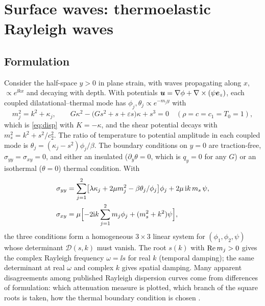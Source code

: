\section{Surface waves: thermoelastic Rayleigh waves}\label{sec:surface}
\subsection{Formulation}
Consider the half-space $y>0$ in plane strain, with waves propagating along $x$, $\propto e^{\ii kx}$ and decaying with depth. With potentials $\bm u=\nabla\phi+\nabla\times(\psi\bm e_z)$, each coupled dilatational--thermal mode has $\phi_j,\theta_j\propto e^{-m_jy}$ with
\begin{equation}
m_j^2=k^2+\kappa_j,\qquad G\kappa^2-\bigl(Gs^2+s+\varepsilon s\bigr)\kappa+s^3=0\quad(\rho=c=c_1=T_0=1),
\end{equation}
which is \eqref{eq:disp} with $K=-\kappa$, and the shear potential decays with $m_s^2=k^2+s^2/c_2^2$. The ratio of temperature to potential amplitude in each coupled mode is $\theta_j=(\kappa_j-s^2)\phi_j/\beta$. The boundary conditions on $y=0$ are traction-free, $\sigma_{yy}=\sigma_{xy}=0$, and either an insulated ($\partial_y\theta=0$, which is $q_y=0$ for any $G$) or an isothermal ($\theta=0$) thermal condition. With
\begin{align}
\sigma_{yy}&=\sum_{j=1}^2\bigl[\lambda\kappa_j+2\mu m_j^2-\beta\theta_j/\phi_j\bigr]\phi_j+2\mu\,\mathrm i k\,m_s\,\psi,\\
\sigma_{xy}&=\mu\Bigl[-2\mathrm i k\sum_{j=1}^2m_j\phi_j+(m_s^2+k^2)\psi\Bigr],
\end{align}
the three conditions form a homogeneous $3\times3$ linear system for $(\phi_1,\phi_2,\psi)$ whose determinant $\mathcal D(s,k)$ must vanish. The root $s(k)$ with $\operatorname{Re} m_j>0$ gives the complex Rayleigh frequency $\omega=\ii s$ for real $k$ (temporal damping); the same determinant at real $\omega$ and complex $k$ gives spatial damping. Many apparent disagreements among published Rayleigh dispersion curves come from differences of formulation: which attenuation measure is plotted, which branch of the square roots is taken, how the thermal boundary condition is chosen \citep{Biswas2020a,Tung2019,Gupta2024,Aldandani2026,Abouelregal2011,Biswas2020c,Chirita2012,Singh2013,Singh2015}.

